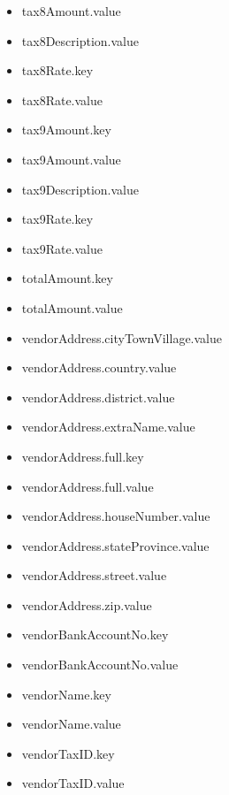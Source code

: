 \begin{multicols}{2}
\begin{itemize}
\item[] tax8Amount.value
\item[] tax8Description.value
\item[] tax8Rate.key
\item[] tax8Rate.value
\item[] tax9Amount.key
\item[] tax9Amount.value
\item[] tax9Description.value
\item[] tax9Rate.key
\item[] tax9Rate.value
\item[] totalAmount.key
\item[] totalAmount.value
\item[] vendorAddress.cityTownVillage.value
\item[] vendorAddress.country.value
\item[] vendorAddress.district.value
\item[] vendorAddress.extraName.value
\item[] vendorAddress.full.key
\item[] vendorAddress.full.value
\item[] vendorAddress.houseNumber.value
\item[] vendorAddress.stateProvince.value
\item[] vendorAddress.street.value
\item[] vendorAddress.zip.value
\item[] vendorBankAccountNo.key
\item[] vendorBankAccountNo.value
\item[] vendorName.key
\item[] vendorName.value
\item[] vendorTaxID.key
\item[] vendorTaxID.value
\end{itemize}
\end{multicols}


